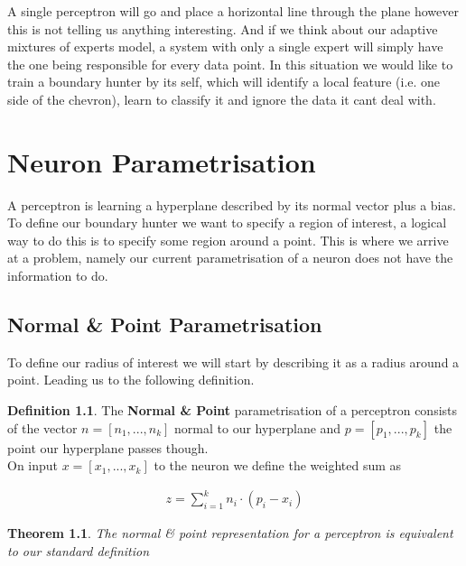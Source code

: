 \documentclass[notitlepage]{report}
\newtheorem{theorem}{Theorem}
\theoremstyle{definition}
\newtheorem{definition}{Definition}[section]
\begin{document}
A single perceptron will go and place a horizontal line through the plane however this is not telling us anything interesting. And if we think about our adaptive mixtures of experts model, a system with only a single expert will simply have the one being responsible for every data point. In this situation we would like to train a boundary hunter by its self, which will identify a local feature (i.e. one side of the chevron), learn to classify it and ignore the data it cant deal with.

\chapter{Neuron Parametrisation}
A perceptron is learning a hyperplane described by its normal vector plus a bias. To define our boundary hunter we want to specify a region of interest, a logical way to do this is to specify some region around a point. This is where we arrive at a problem, namely our current parametrisation of a neuron does not have the information to do.

\section{Normal \& Point Parametrisation}
To define our radius of interest we will start by describing it as a radius around a point. Leading us to the following definition.

\theoremstyle{definition}
\begin{definition}
	The \textbf{Normal \& Point} parametrisation of a perceptron consists of the vector $n = [n_1, ..., n_k]$ normal to our hyperplane and $p = [p_1, ..., p_k]$ the point our hyperplane passes though.\\
	
	On input $x = [x_1, ..., x_k]$ to the neuron we define the weighted sum as 
	
	\begin{align*}
	z = \sum_{i=1}^k n_i \cdot (p_i - x_i)
	\end{align*}
\end{definition}

\begin{theorem}
The normal \& point representation for a perceptron is equivalent to our standard definition
\end{theorem}
\end{document}
